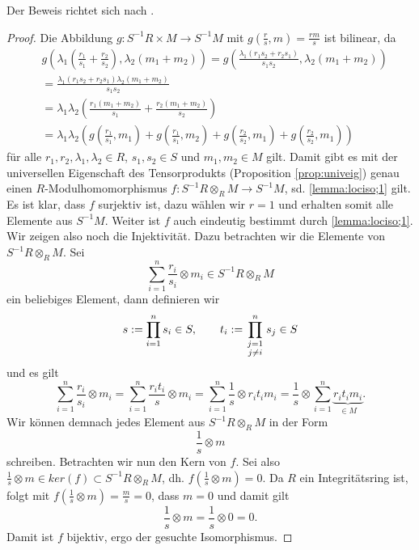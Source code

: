 \documentclass[11pt,titlepage]{article}
\theoremstyle{definition}
\theoremstyle{remark}
\begin{document}
	Der Beweis richtet sich nach \cite[Proposition 3.5]{introductiontocomalg}.
	
	\begin{proof}
		Die Abbildung $g:S^{-1}R\times M\to S^{-1}M$ mit $g\left(\frac{r}{s},m\right)=\frac{rm}{s}$ ist bilinear, da 
		\begin{align*}
			&g\left(\lambda_1\left(\frac{r_1}{s_1}+\frac{r_2}{s_2}\right),
			\lambda_2 (m_1+m_2)\right)=g\left(\frac{\lambda_1 (r_1 s_2+r_2
			 s_1)}{s_1s_2},\lambda_2(m_1+m_2)\right) \\
			&=\frac{\lambda_1(r_1s_2+r_2s_1)\lambda_2(m_1+m_2)}{s_1s_2}\\
			&=\lambda_1\lambda_2\left(\frac{r_1(m_1+m_2)}{s_1}+
			\frac{r_2(m_1+m_2)}{s_2}\right) \\
			&=\lambda_1\lambda_2 \left(g\left(\frac{r_1}{s_1},m_1\right)
			+g\left(\frac{r_1}{s_1},m_2\right)+g\left(\frac{r_2}{s_2},m_1\right)+
			g\left(\frac{r_2}{s_2},m_1\right)\right)
		\end{align*}
		für alle $r_1,r_2,\lambda_1,\lambda_2\in R$, $s_1,s_2 \in S$ und 
		$m_1,m_2\in M$ gilt. Damit gibt es mit der universellen Eigenschaft 
		des Tensorprodukts (Proposition \ref{prop:univeig}) genau einen 
		$R$-Modulhomomorphismus $f:S^{-1}R\otimes_R M\to S^{-1}M$, sd. 
		\ref{lemma:lociso;1} gilt. Es ist klar, dass $f$ surjektiv ist, 
		dazu wählen wir $r=1$ und erhalten somit alle Elemente aus 
		$S^{-1}M$. Weiter ist $f$ auch eindeutig bestimmt durch 
		\ref{lemma:lociso;1}. \\
		Wir zeigen also noch die Injektivität. Dazu betrachten wir die 
		Elemente von $S^{-1}R\otimes_R M$. Sei  
		\[\sum_{i=1}^n \frac{r_i}{s_i}\otimes m_i \in S^{-1}R\otimes_R M\]
		ein beliebiges Element, dann definieren wir
		\[s:=\prod_{i=1}^n s_i\in S,\qquad t_i:=\prod_{\genfrac{}{}{0pt}{1}{j=1}{j\neq i}}^n s_j\in S\]
		und es gilt 
		\[\sum_{i=1}^n \frac{r_i}{s_i}\otimes m_i =
		\sum_{i=1}^n \frac{r_it_i}{s}\otimes m_i =\sum_{i=1}^n 
		\frac{1}{s}\otimes r_i t_i m_i =\frac{1}{s}\otimes\sum_{i=1}^n
		\underbrace{r_it_im_i}_{\in M}.\]
		Wir können demnach jedes Element aus $S^{-1}R\otimes_R M$ in der Form 
		\[\frac{1}{s}\otimes m\]
		schreiben. Betrachten wir nun den Kern von $f$. Sei also 
		$\frac{1}{s}\otimes m \in ker(f)\subset S^{-1}R\otimes_R M$, dh. 
		$f\left(\frac{1}{s}\otimes m\right)=0$. Da $R$ ein 
		Integritätsring ist, folgt mit $f\left(\frac{1}{s}\otimes m\right)=\frac{m}{s}=0$, dass $m=0$ und damit gilt
		\[\frac{1}{s}\otimes m =\frac{1}{s}\otimes 0=0.\]
		Damit ist $f$ bijektiv, ergo der gesuchte Isomorphismus.
	\end{proof}
	
\end{document}
